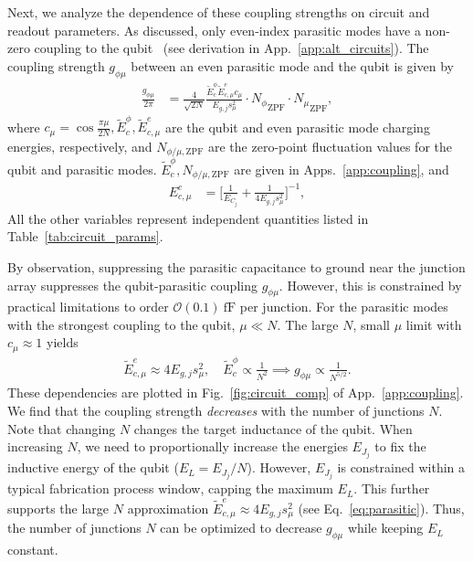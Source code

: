 \documentclass[%
reprint,
superscriptaddress,
 amsmath,amssymb,
 aps,
 prx,
longbibliography,
floatfix,
]{revtex4-2}
\newcommand{\singh}[1]{{\color{orange}{{}#1}}}%
\begin{document}
Next, we analyze the dependence of these coupling strengths on circuit and readout parameters. As discussed, only even-index parasitic modes have a non-zero coupling to the qubit~\cite{viola2015collective} (see derivation in App.~\ref{app:alt_circuits}). The coupling strength $g_{\phi \mu}$ between an even parasitic mode and the qubit is given by
\begin{align}
\frac{g_{\phi\mu}}{2\pi}&=\frac{4}{\sqrt{2N}} \frac{\tilde{E}^\phi_c\tilde{E}^e_{c,\mu}c_\mu}{E_{g,j}s_\mu^2}     \cdot {N_\phi}_{\mathrm{ZPF}} \cdot {N_\mu}_{\mathrm{ZPF}},
\end{align}
where $c_\mu=\cos{\frac{\pi\mu}{2N}},\tilde{E}_c^\phi,\tilde{E}^e_{c,\mu} $ are the qubit and even parasitic mode charging energies, respectively, and $N_{\phi/\mu,\mathrm{ZPF}}$ are the zero-point fluctuation values for the qubit and parasitic modes. $\tilde{E}_c^\phi,N_{\phi/\mu,\mathrm{ZPF}}$ are given in Apps.~\ref{app:coupling}, and
\begin{align}
E_{c,\mu}^e&=\Big[\frac{1}{E_{C_j}}+\frac{1}{4E_{g,j}s_\mu^2}\Big]^{-1},\label{eq:parasitic}
\end{align}
\singh{where $s_\mu = \sin (\frac{\pi \mu}{2N})$.} All the other variables represent independent quantities listed in Table~\ref{tab:circuit_params}. 

By observation, suppressing the parasitic capacitance to ground near the junction array suppresses the qubit-parasitic coupling $g_{\phi\mu}$. However, this is constrained by practical limitations to order $\mathcal{O}(0.1) \ \mathrm{fF}$  per junction. For the parasitic modes with the strongest coupling to the qubit, $\mu\ll N$. The large $N$, small $\mu$ limit with $c_\mu\approx 1$ yields
\begin{align}
    \tilde{E}^e_{c,\mu}\approx 4E_{g,j}s_\mu^2, \quad \tilde{E}^\phi_c\propto \frac{1}{N^2}\implies g_{\phi\mu}\propto \frac{1}{N^{5/2}}.\label{eq:dep1}
\end{align}
These dependencies are plotted in Fig.~\ref{fig:circuit_comp} of App.~\ref{app:coupling}. We find that the coupling strength \textit{decreases} with the number of junctions $N$. Note that changing $N$ changes the target inductance of the qubit. When increasing $N$, we need to proportionally increase the energies $E_{J_j}$ to fix the inductive energy of the qubit ($E_L=E_{J_j}/N$). However, $E_{J_j}$ is constrained within a typical fabrication process window, capping the maximum $E_{L}$.
This further supports the large $N$ approximation $\tilde{E}_{c,\mu}^e\approx 4E_{g,j}s_\mu^2$ (see Eq.~\ref{eq:parasitic}). Thus, the number of junctions $N$ can be optimized to decrease $g_{\phi\mu}$ while keeping $E_L$ constant. 
\end{document}
